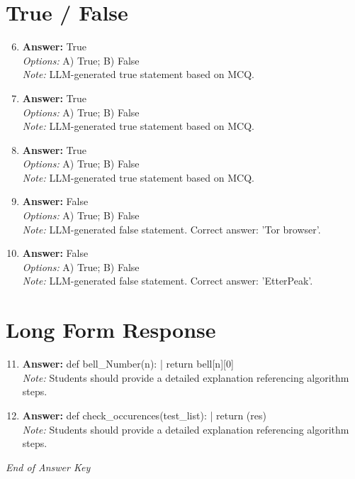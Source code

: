 \documentclass[12pt]{article}
\begin{document}
\section*{True / False}
\begin{enumerate}[label=\arabic*.]
\setcounter{enumi}{5}
\item \textbf{Answer:} True
\\ \textit{Options:} A) True; B) False
\\ \textit{Note:} LLM-generated true statement based on MCQ.
\item \textbf{Answer:} True
\\ \textit{Options:} A) True; B) False
\\ \textit{Note:} LLM-generated true statement based on MCQ.
\item \textbf{Answer:} True
\\ \textit{Options:} A) True; B) False
\\ \textit{Note:} LLM-generated true statement based on MCQ.
\item \textbf{Answer:} False
\\ \textit{Options:} A) True; B) False
\\ \textit{Note:} LLM-generated false statement. Correct answer: 'Tor browser'.
\item \textbf{Answer:} False
\\ \textit{Options:} A) True; B) False
\\ \textit{Note:} LLM-generated false statement. Correct answer: 'EtterPeak'.
\end{enumerate}

\section*{Long Form Response}
\begin{enumerate}[label=\arabic*.]
\setcounter{enumi}{10}
\item \textbf{Answer:} def bell\_Number(n): | return bell[n][0]
\\ \textit{Note:} Students should provide a detailed explanation referencing algorithm steps.
\item \textbf{Answer:} def check\_occurences(test\_list): | return (res)
\\ \textit{Note:} Students should provide a detailed explanation referencing algorithm steps.
\end{enumerate}

\vfill
\noindent\textit{End of Answer Key}
\end{document}
